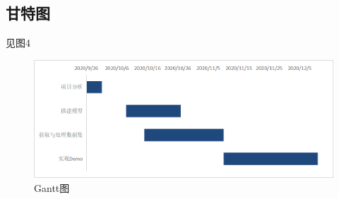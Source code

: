 \documentclass[
  hyperref, a4paper]{ctexart}
\begin{document}
\hypertarget{ux7518ux7279ux56fe}{%
\subsection{甘特图}\label{ux7518ux7279ux56fe}}

见图4

\begin{figure}
\centering
\includegraphics{3.png}
\caption{Gantt图}
\end{figure}
\end{document}
